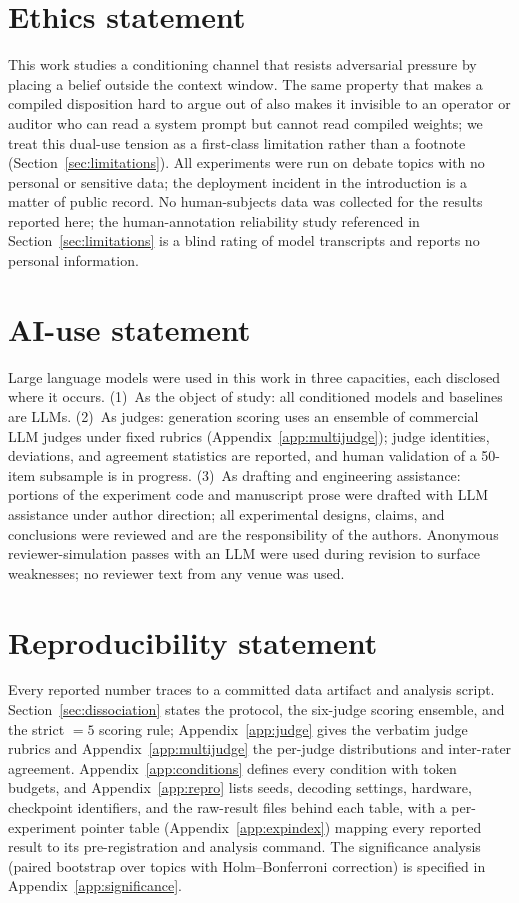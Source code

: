 
\section*{Ethics statement}
This work studies a conditioning channel that resists adversarial pressure by placing a
belief outside the context window. The same property that makes a compiled disposition hard
to argue out of also makes it invisible to an operator or auditor who can read a system
prompt but cannot read compiled weights; we treat this dual-use tension as a first-class
limitation rather than a footnote (Section~\ref{sec:limitations}). All experiments were run
on debate topics with no personal or sensitive data; the deployment incident in the
introduction is a matter of public record. No human-subjects data was collected for the
results reported here; the human-annotation reliability study referenced in
Section~\ref{sec:limitations} is a blind rating of model transcripts and reports no
personal information.

\section*{AI-use statement}
Large language models were used in this work in three capacities, each disclosed where it
occurs. (1)~As the object of study: all conditioned models and baselines are LLMs.
(2)~As judges: generation scoring uses an ensemble of commercial LLM judges under fixed
rubrics (Appendix~\ref{app:multijudge}); judge identities, deviations, and agreement statistics
are reported, and human validation of a 50-item subsample is in progress. (3)~As drafting and
engineering assistance: portions of the experiment code and manuscript prose were drafted with
LLM assistance under author direction; all experimental designs, claims, and conclusions were
reviewed and are the responsibility of the authors. Anonymous reviewer-simulation passes with an
LLM were used during revision to surface weaknesses; no reviewer text from any venue was used.

\section*{Reproducibility statement}
Every reported number traces to a committed data artifact and analysis script.
Section~\ref{sec:dissociation} states the protocol, the six-judge scoring ensemble, and the
strict \(=5\) scoring rule; Appendix~\ref{app:judge} gives the verbatim judge rubrics and
Appendix~\ref{app:multijudge} the per-judge distributions and inter-rater agreement.
Appendix~\ref{app:conditions} defines every condition with token budgets, and
Appendix~\ref{app:repro} lists seeds, decoding settings, hardware, checkpoint identifiers,
and the raw-result files behind each table, with a per-experiment pointer table
(Appendix~\ref{app:expindex}) mapping every reported result to its pre-registration and
analysis command. The significance analysis (paired bootstrap over topics with
Holm--Bonferroni correction) is specified in Appendix~\ref{app:significance}.
